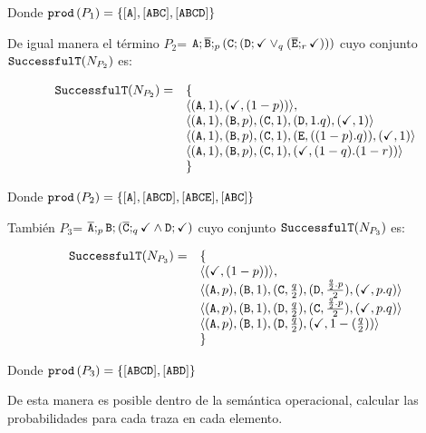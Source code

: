 Donde $\mathtt{prod}\left(P_1\right)=\{[\mathtt{A}],[\mathtt{A}\mathtt{B}\mathtt{C}],[\mathtt{A}\mathtt{B}\mathtt{C}\mathtt{D}]\}$

De igual manera el término $P_2$=
$\mathtt{A};\overline{\mathtt{B}};_{p}(\mathtt{C};(\mathtt{D};\checkmark\mathbin{\lor}_{q}(\overline{\mathtt{E}};_{r}\checkmark)))$
cuyo conjunto $\mathtt{SuccessfulT}(N_{P_2})$ es:

$$
\begin{array}{ll}
\mathtt{SuccessfulT}(N_{P_2})=&\{ \\
&  \langle(\mathtt{A},1),(\checkmark,(1-p))\rangle,\\ 
&\langle(\mathtt{A},1),(\mathtt{B},p),(\mathtt{C},1),(\mathtt{D},1.q),(\checkmark,1)\rangle\\ 
&\langle(\mathtt{A},1),(\mathtt{B},p),(\mathtt{C},1),(\mathtt{E},((1-p).q)),(\checkmark,1)\rangle\\
&\langle(\mathtt{A},1),(\mathtt{B},p),(\mathtt{C},1),(\checkmark,(1-q).(1-r))\rangle\\
& \}
\end{array}     
$$

Donde $\mathtt{prod}\left(P_2\right)=\{[\mathtt{A}],[\mathtt{A}\mathtt{B}\mathtt{C}\mathtt{D}],[\mathtt{A}\mathtt{B}\mathtt{C}\mathtt{E}],[\mathtt{A}\mathtt{B}\mathtt{C}]\}$




También $P_3$=
$\overline{\mathtt{A}};_{p}\mathtt{B};(\overline{\mathtt{C}};_{q}\checkmark\mathbin{\wedge}\mathtt{D};\checkmark)$
cuyo conjunto $\mathtt{SuccessfulT}(N_{P_3})$ es:

$$
\begin{array}{ll}
\mathtt{SuccessfulT}(N_{P_3})=&\{ \\
&  \langle(\checkmark,(1-p))\rangle,\\ 
&\langle(\mathtt{A},p),(\mathtt{B},1),(\mathtt{C},\frac{q}{2}),(\mathtt{D},\frac{\frac{q}{2}.p}{2}),(\checkmark,p.q)\rangle\\ 
&\langle(\mathtt{A},p),(\mathtt{B},1),(\mathtt{D},\frac{q}{2}),(\mathtt{C},\frac{\frac{q}{2}.p}{2}),(\checkmark,p.q)\rangle\\ 
&\langle(\mathtt{A},p),(\mathtt{B},1),(\mathtt{D},\frac{q}{2}),(\checkmark,1-(\frac{q}{2}))\rangle\\ 
& \}
\end{array}     
$$

Donde $\mathtt{prod}\left(P_3\right)=\{[\mathtt{A}\mathtt{B}\mathtt{C}\mathtt{D}],[\mathtt{A}\mathtt{B}\mathtt{D}]\}$

De esta manera es posible dentro de la semántica operacional, calcular
las probabilidades para cada traza en cada elemento.